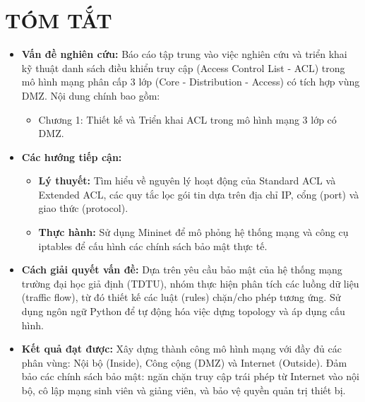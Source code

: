 \section*{TÓM TẮT}

\begin{itemize}
    \item[-] \textbf{Vấn đề nghiên cứu:}
    Báo cáo tập trung vào việc nghiên cứu và triển khai kỹ thuật danh sách điều khiển truy cập (Access Control List - ACL) trong mô hình mạng phân cấp 3 lớp (Core - Distribution - Access) có tích hợp vùng DMZ. Nội dung chính bao gồm:
        \begin{itemize}
        \item[•] Chương 1: Thiết kế và Triển khai ACL trong mô hình mạng 3 lớp có DMZ.
        \end{itemize}
        
    \item[-] \textbf{Các hướng tiếp cận:}
        \begin{itemize}
        \item[•] \textbf{Lý thuyết:} Tìm hiểu về nguyên lý hoạt động của Standard ACL và Extended ACL, các quy tắc lọc gói tin dựa trên địa chỉ IP, cổng (port) và giao thức (protocol).
        \item[•] \textbf{Thực hành:} Sử dụng Mininet để mô phỏng hệ thống mạng và công cụ iptables để cấu hình các chính sách bảo mật thực tế.
        \end{itemize}
        
    \item[-] \textbf{Cách giải quyết vấn đề:}
    Dựa trên yêu cầu bảo mật của hệ thống mạng trường đại học giả định (TDTU), nhóm thực hiện phân tích các luồng dữ liệu (traffic flow), từ đó thiết kế các luật (rules) chặn/cho phép tương ứng. Sử dụng ngôn ngữ Python để tự động hóa việc dựng topology và áp dụng cấu hình.

    \item[-] \textbf{Kết quả đạt được:}
    Xây dựng thành công mô hình mạng với đầy đủ các phân vùng: Nội bộ (Inside), Công cộng (DMZ) và Internet (Outside). Đảm bảo các chính sách bảo mật: ngăn chặn truy cập trái phép từ Internet vào nội bộ, cô lập mạng sinh viên và giảng viên, và bảo vệ quyền quản trị thiết bị.
\end{itemize}

\newpage